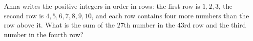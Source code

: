 Anna writes the positive integers in order in rows: the first row is $1,2,3$, the second row is $4,5,6,7,8,9,10$, and each row contains four more numbers than the row above it. What is the sum of the $27$th number in the $43$rd row and the third number in the fourth row?
